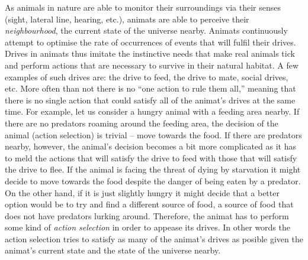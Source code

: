 As animals in nature are able to monitor their surroundings via their senses (sight, lateral line, hearing, etc.), animats are able to perceive their \emph{neighbourhood}, the current state of the universe nearby. Animats continuously attempt to optimise the rate of occurrences of events that will fulfil their drives. Drives in animats thus imitate the instinctive needs that make real animals tick and perform actions that are necessary to survive in their natural habitat. A few examples of such drives are: the drive to feed, the drive to mate, social drives, etc. More often than not there is no ``one action to rule them all,'' meaning that there is no single action that could satisfy all of the animat's drives at the same time. For example, let us consider a hungry animal with a feeding area nearby. If there are no predators roaming around the feeding area, the decision of the animal (action selection) is trivial -- move towards the food. If there are predators nearby, however, the animal's decision becomes a bit more complicated as it has to meld the actions that will satisfy the drive to feed with those that will satisfy the drive to flee. If the animal is facing the threat of dying by starvation it might decide to move towards the food despite the danger of being eaten by a predator. On the other hand, if it is just slightly hungry it might decide that a better option would be to try and find a different source of food, a source of food that does not have predators lurking around. Therefore, the animat has to perform some kind of \emph{action selection} in order to appease its drives. In other words the action selection tries to satisfy as many of the animat's drives as posible given the animat's current state and the state of the universe nearby.

